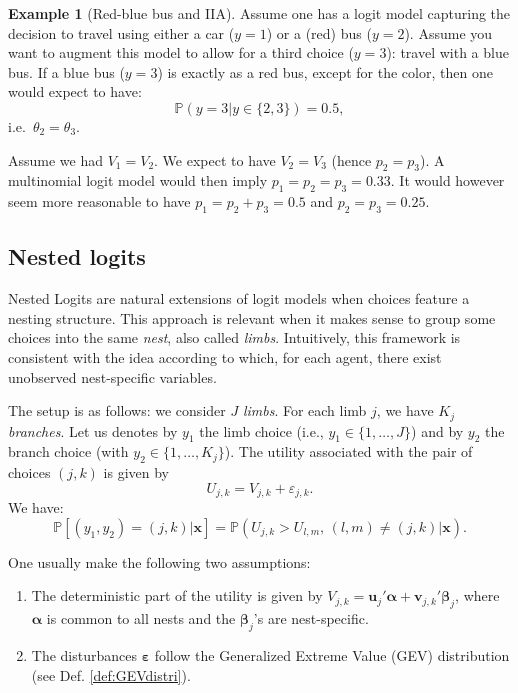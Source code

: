 \documentclass[
  12pt,
]{book}
\theoremstyle{definition}
\theoremstyle{definition}
\newtheorem{example}{Example}[chapter]
\theoremstyle{definition}
\theoremstyle{definition}
\theoremstyle{remark}
\begin{document}
\begin{example}[Red-blue bus and IIA]
\protect\hypertarget{exm:redbluebus}{}\label{exm:redbluebus}Assume one has a logit model capturing the decision to travel using either a car (\(y=1\)) or a (red) bus (\(y=2\)). Assume you want to augment this model to allow for a third choice (\(y=3\)): travel with a blue bus. If a blue bus (\(y=3\)) is exactly as a red bus, except for the color, then one would expect to have:
\[
\mathbb{P}(y=3|y \in \{2,3\}) = 0.5,
\]
i.e.~\(\theta_2 = \theta_3\).

Assume we had \(V_1=V_2\). We expect to have \(V_2=V_3\) (hence \(p_2=p_3\)). A multinomial logit model would then imply \(p_1=p_2=p_3=0.33\). It would however seem more reasonable to have \(p_1 = p_2 + p_3 = 0.5\) and \(p_2=p_3=0.25\).
\end{example}

\hypertarget{nested-logits}{%
\subsection{Nested logits}\label{nested-logits}}

Nested Logits are natural extensions of logit models when choices feature a nesting structure. This approach is relevant when it makes sense to group some choices into the same \emph{nest}, also called \emph{limbs}. Intuitively, this framework is consistent with the idea according to which, for each agent, there exist unobserved nest-specific variables.

The setup is as follows: we consider \(J\) \emph{limbs}. For each limb \(j\), we have \(K_j\) \emph{branches}. Let us denotes by \(y_1\) the limb choice (i.e., \(y_1 \in \{1,\dots,J\}\)) and by \(y_2\) the branch choice (with \(y_2 \in \{1,\dots,K_j\}\)). The utility associated with the pair of choices \((j,k)\) is given by
\[
U_{j,k} = V_{j,k} + \varepsilon_{j,k}.
\]
We have:
\[
\mathbb{P}[(y_1,y_2) = (j,k)|\mathbf{x}] = \mathbb{P}(U_{j,k}>U_{l,m},\,(l,m) \ne (j,k)|\mathbf{x}).
\]

One usually make the following two assumptions:

\begin{enumerate}
\def\labelenumi{\roman{enumi}.}
\item
  The deterministic part of the utility is given by \(V_{j,k} = \mathbf{u}_j'\boldsymbol\alpha + \mathbf{v}_{j,k}'\boldsymbol\beta_j\), where \(\boldsymbol\alpha\) is common to all nests and the \(\boldsymbol\beta_j\)'s are nest-specific.
\item
  The disturbances \(\boldsymbol\varepsilon\) follow the Generalized Extreme Value (GEV) distribution (see Def. \ref{def:GEVdistri}).
\end{enumerate}
\end{document}
